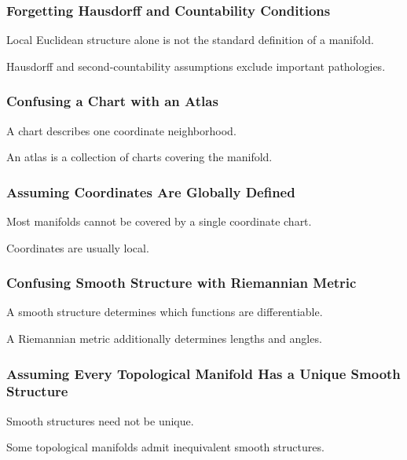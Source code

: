 \subsubsection{Forgetting Hausdorff and Countability Conditions}

Local Euclidean structure alone is not the standard definition of a
manifold.

Hausdorff and second-countability assumptions exclude important
pathologies.

\subsubsection{Confusing a Chart with an Atlas}

A chart describes one coordinate neighborhood.

An atlas is a collection of charts covering the manifold.

\subsubsection{Assuming Coordinates Are Globally Defined}

Most manifolds cannot be covered by a single coordinate chart.

Coordinates are usually local.

\subsubsection{Confusing Smooth Structure with Riemannian Metric}

A smooth structure determines which functions are differentiable.

A Riemannian metric additionally determines lengths and angles.

\subsubsection{Assuming Every Topological Manifold Has a Unique Smooth Structure}

Smooth structures need not be unique.

Some topological manifolds admit inequivalent smooth structures.


